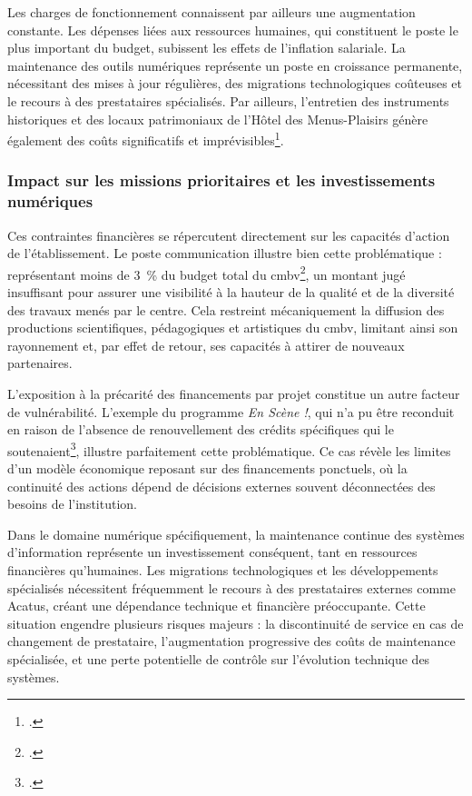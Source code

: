 Les charges de fonctionnement connaissent par ailleurs une augmentation constante. Les dépenses liées aux ressources humaines, qui constituent le poste le plus important du budget, subissent les effets de l'inflation salariale. La maintenance des outils numériques représente un poste en croissance permanente, nécessitant des mises à jour régulières, des migrations technologiques coûteuses et le recours à des prestataires spécialisés. Par ailleurs, l'entretien des instruments historiques et des locaux patrimoniaux de l'Hôtel des Menus-Plaisirs génère également des coûts significatifs et imprévisibles\footcite{centredemusiquebaroquedeversaillesProjetEtablissement2022}.

\subsubsection{Impact sur les missions prioritaires et les investissements numériques}

Ces contraintes financières se répercutent directement sur les capacités d'action de l'établissement. Le poste communication illustre bien cette problématique : représentant moins de 3~\% du budget total du \gls{cmbv}\footcite{centredemusiquebaroquedeversaillesProjetEtablissement2022}, un montant jugé insuffisant pour assurer une visibilité à la hauteur de la qualité et de la diversité des travaux menés par le centre. Cela restreint mécaniquement la diffusion des productions scientifiques, pédagogiques et artistiques du \gls{cmbv}, limitant ainsi son rayonnement et, par effet de retour, ses capacités à attirer de nouveaux partenaires.

L'exposition à la précarité des financements par projet constitue un autre facteur de vulnérabilité. L'exemple du programme \textit{En Scène !}, qui n'a pu être reconduit en raison de l'absence de renouvellement des crédits spécifiques qui le soutenaient\footcite{centredemusiquebaroquedeversaillesRapportActivite2023}, illustre parfaitement cette problématique. Ce cas révèle les limites d'un modèle économique reposant sur des financements ponctuels, où la continuité des actions dépend de décisions externes souvent déconnectées des besoins de l'institution.

Dans le domaine numérique spécifiquement, la maintenance continue des systèmes d'information représente un investissement conséquent, tant en ressources financières qu'humaines. Les migrations technologiques et les développements spécialisés nécessitent fréquemment le recours à des prestataires externes comme Acatus, créant une dépendance technique et financière préoccupante. Cette situation engendre plusieurs risques majeurs : la discontinuité de service en cas de changement de prestataire, l'augmentation progressive des coûts de maintenance spécialisée, et une perte potentielle de contrôle sur l'évolution technique des systèmes.

